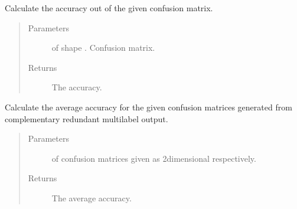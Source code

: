\documentclass[letterpaper,10pt,english]{sphinxmanual}
\begin{document}
\begin{fulllineitems}
\label{\detokenize{pusion.util.transformer:pusion.util.transformer.confusion_matrix_to_accuracy}}
\sphinxAtStartPar
Calculate the accuracy out of the given confusion matrix.
\begin{quote}\begin{description}
\item[{Parameters}] \leavevmode
\sphinxAtStartPar
{} \textendash{}  of shape .
Confusion matrix.

\item[{Returns}] \leavevmode
\sphinxAtStartPar
The accuracy.

\end{description}\end{quote}

\end{fulllineitems}


\begin{fulllineitems}
\label{\detokenize{pusion.util.transformer:pusion.util.transformer.multilabel_cr_confusion_matrices_to_avg_accuracy}}
\sphinxAtStartPar
Calculate the average accuracy for the given confusion matrices generated from complementary redundant multilabel
output.
\begin{quote}\begin{description}
\item[{Parameters}] \leavevmode
\sphinxAtStartPar
{} \textendash{}  of confusion matrices given as 2\sphinxhyphen{}dimensional  respectively.

\item[{Returns}] \leavevmode
\sphinxAtStartPar
The average accuracy.

\end{description}\end{quote}

\end{fulllineitems}
\end{document}
